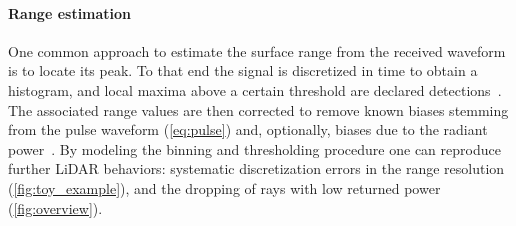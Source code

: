 \paragraph{Range estimation}
One common approach to estimate the surface range from the received waveform is to locate its peak. To that end the signal is discretized in time to obtain a histogram, and local maxima above a certain threshold are declared detections~\cite{winiwarter2022virtual}. The associated range values are then corrected to remove known biases stemming from the pulse waveform (\cf \cref{eq:pulse}) and, optionally, biases due to the radiant power~\cite{winiwarter2022virtual}.
By modeling the binning and thresholding procedure one can reproduce further LiDAR  behaviors: systematic discretization errors in the range resolution (\cf \cref{fig:toy_example}), and the dropping of rays with low returned power (\cf \cref{fig:overview}).


